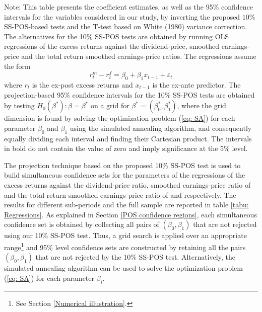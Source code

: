 \documentclass[harvard,11pt]{article}
\begin{document}
\begin{table}[hbtp!]
\begin{minipage}{\linewidth}
\vspace{1pt}
Note: This table presents the coefficient estimates, as well as the 95\% confidence intervals for the variables considered in our study, by inverting the proposed 10\% SS-POS-based tests and the T-test based on White (1980) variance correction. The alternatives for the 10\% SS-POS tests are obtained by running OLS regressions of the excess returns against the dividend-price, smoothed earnings-price and the total return smoothed earnings-price ratios. The regressions assume the form 
\begin{equation}\label{eq: Regressions}
r_t^m-r_t^f=\beta_0+\beta_1 x_{t-1}+\varepsilon_t
\end{equation}
where $r_t$ is the ex-post excess returns and $x_{t-1}$ is the ex-ante predictor. The projection-based 95\% confidence intervals for the 10\% SS-POS tests are obtained by testing $H_0(\beta^{*}):\beta=\beta^{*}$ on a grid for $\beta^{*}=(\beta_0^{*},\beta_1^{*})$, where the grid dimension is found by solving the optimization problem (\ref{eq: SA}) for each parameter $\beta_0$ and $\beta_1$ using the simulated annealing algorithm, and consequently equally dividing each interval and finding their Cartesian product. The intervals in bold do not contain the value of zero and imply significance at the 5\% level.
\end{minipage}
\end{table}


The projection technique based on the proposed 10\% SS-POS test is used to build simultaneous confidence sets for the parameters of the regressions of the excess returns against the
dividend-price ratio, smoothed earnings-price ratio of \citet{campbell1988dividend} and the total return smoothed earnings-price ratio of \citet{bunn2014cape} and \citet{jivraj2017many} respectively. The results for different sub-periods and the full sample are reported in table \ref{tabu: Regressions}. As explained in Section \ref{POS confidence regions}, each simultaneous confidence set is obtained by
collecting all pairs of $(\beta_0 ,\beta_1 )$ that are not rejected using our 10\% SS-POS test. Thus, a grid search is applied over an appropriate range\footnote{See Section \ref{Numerical illustration}.} and 95\% level confidence sets are constructed by retaining all the pairs $(\beta_0 ,\beta_1 )$ that are not
rejected by the 10\% SS-POS test. Alternatively, the simulated annealing algorithm can be used to solve the optimization problem (\ref{eq: SA}) for each parameter $\beta_i$. 
\end{document}
